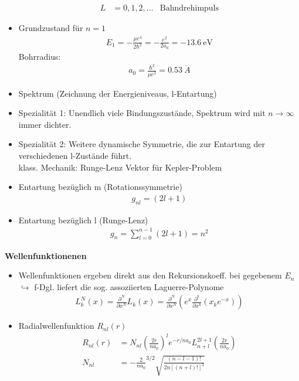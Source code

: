 \documentclass[10pt,article,colorback,accentcolor=tud9d]{scrartcl}
\begin{document}
\begin{itemize}
\begin{align}
    L&=0,1,2,... &\text{Bahndrehimpuls}
    \end{align}
  \item Grundzustand für $n=1$ 
    \begin{align}
    E_1=-\frac{\mu e^4}{2\hbar^2}=-\frac{e^2}{2a_0}=-13.6~\text{eV}
    \end{align}
    Bohrradius:
    \begin{align}
    a_0=\frac{\hbar^2}{\mu e^2}=0.53~\mathring{A}
    \end{align}
  \item Spektrum (Zeichnung der Energieniveaus, l-Entartung)
  \item Spezialität 1: Unendlich viele Bindungszustände, Spektrum wird mit $n\rightarrow\infty$ immer dichter.
  \item Spezialität 2: Weitere dynamische Symmetrie, die zur Entartung der verschiedenen l-Zustände führt.\\
    klass. Mechanik: Runge-Lenz Vektor für Kepler-Problem
  \item Entartung bezüglich m (Rotationssymmetrie)
    \begin{align}
    g_{nl}=(2l+1)
    \end{align}
  \item Entartung bezüglich l (Runge-Lenz)
    \begin{align}
    g_n=\sum_{l=0}^{n-1}(2l+1)=n^2
    \end{align}
\end{itemize}


\noindent\textbf{Wellenfunktionenen}

\begin{itemize}
  \item Wellenfunktionen ergeben direkt aus den Rekursionskoeff. bei gegebenem $E_n$\\
    $\hookrightarrow$ f-Dgl. liefert die sog. assoziierten Laguerre-Polynome
    \begin{align}
    L^N_k(x)=\frac{\partial^N}{\partial x^N}L_k(x)=\frac{\partial^N}{\partial x^N}\left(e^x\frac{\partial^k}{\partial x^k}(x_k e^{-x})\right)
    \end{align}
  \item Radialwellenfunktion $R_{nl}(r)$
    \begin{align}
    R_{nl}(r)&=N_{nl}\left(\frac{2r}{na_0}\right)^le^{-r/na_0}L^{2l+1}_{n+l}\left(\frac{2r}{na_0}\right)\\
    N_{nl}&=-\frac{2}{na_0}^{3/2}\sqrt{\frac{(n-l-1)!}{2n[(n+l)!]^3}}
    \end{align}
\end{itemize}
\end{document}
